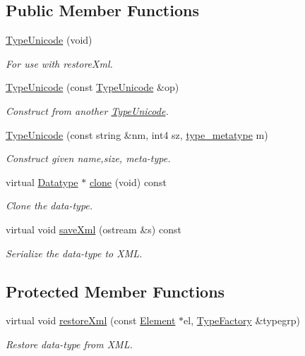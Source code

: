 \subsection*{Public Member Functions}
\begin{DoxyCompactItemize}
\item 
\mbox{\hyperlink{class_type_unicode_a4827b7df37d1775c626997f2839df772}{Type\+Unicode}} (void)
\begin{DoxyCompactList}\small\item\em For use with restore\+Xml. \end{DoxyCompactList}\item 
\mbox{\hyperlink{class_type_unicode_a19534a8363708e5982f6efe88c6c527e}{Type\+Unicode}} (const \mbox{\hyperlink{class_type_unicode}{Type\+Unicode}} \&op)
\begin{DoxyCompactList}\small\item\em Construct from another \mbox{\hyperlink{class_type_unicode}{Type\+Unicode}}. \end{DoxyCompactList}\item 
\mbox{\hyperlink{class_type_unicode_a4987eb78f555c02c10c68ad186b9081d}{Type\+Unicode}} (const string \&nm, int4 sz, \mbox{\hyperlink{type_8hh_aef6429f2523cdf4d415ba04a0209e61f}{type\+\_\+metatype}} m)
\begin{DoxyCompactList}\small\item\em Construct given name,size, meta-\/type. \end{DoxyCompactList}\item 
virtual \mbox{\hyperlink{class_datatype}{Datatype}} $\ast$ \mbox{\hyperlink{class_type_unicode_ab347e36debf5530b33cbfa2b329f9554}{clone}} (void) const
\begin{DoxyCompactList}\small\item\em Clone the data-\/type. \end{DoxyCompactList}\item 
virtual void \mbox{\hyperlink{class_type_unicode_a4dada4691cd95b817fc6a0bd99031cd6}{save\+Xml}} (ostream \&s) const
\begin{DoxyCompactList}\small\item\em Serialize the data-\/type to X\+ML. \end{DoxyCompactList}\end{DoxyCompactItemize}
\subsection*{Protected Member Functions}
\begin{DoxyCompactItemize}
\item 
virtual void \mbox{\hyperlink{class_type_unicode_a3158417117649e59ffe402137c22bb67}{restore\+Xml}} (const \mbox{\hyperlink{class_element}{Element}} $\ast$el, \mbox{\hyperlink{class_type_factory}{Type\+Factory}} \&typegrp)
\begin{DoxyCompactList}\small\item\em Restore data-\/type from X\+ML. \end{DoxyCompactList}\end{DoxyCompactItemize}

